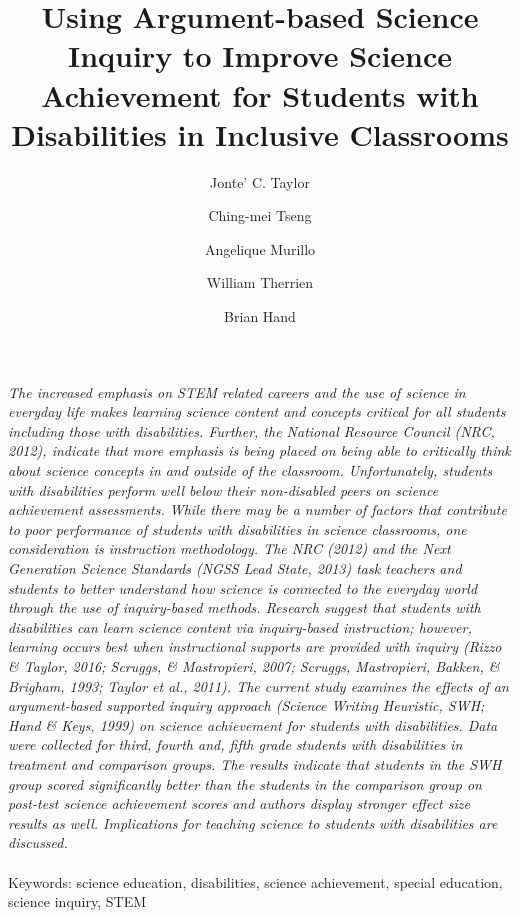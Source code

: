 \documentclass[11.5pt]{sig-alternate} %
\makeatletter
\let\oldabstract\abstract
\let\oldendabstract\endabstract
\renewenvironment{abstract} %
{\renewenvironment{quotation}%
               {\list{}{\addtolength{\leftmargin}{1em} %
                        \listparindent 1.5em%
                        \itemindent    \listparindent%
                        \rightmargin   \leftmargin%
                        \parsep        \z@ \@plus\p@}%
                \item\relax}%
               {\endlist}%
\oldabstract}
{\oldendabstract}
\makeatother
\begin{document}
\title{Using Argument-based Science Inquiry to Improve Science Achievement for Students with Disabilities in Inclusive Classrooms}

\author[1]{\large \color{blue}Jonte’ C. Taylor}
\author[2]{\large \color{blue}Ching-mei Tseng}
\author[1]{\large \color{blue}Angelique Murillo}
\author[3]{\large \color{blue}William Therrien}
\author[4]{\large \color{blue}Brian Hand}


\toappear{}
\maketitle
\begin{@twocolumnfalse} 
\begin{abstract}
\item 
\textit{The increased emphasis on STEM related careers and the use of science in everyday life makes learning science content and concepts critical for all students including those with disabilities. Further, the National Resource Council (NRC, 2012), indicate that more emphasis is being placed on being able to critically think about science concepts in and outside of the classroom.  Unfortunately, students with disabilities perform well below their non-disabled peers on science achievement assessments.  While there may be a number of factors that contribute to poor performance of students with disabilities in science classrooms, one consideration is instruction methodology.  The NRC (2012) and the Next Generation Science Standards (NGSS Lead State, 2013) task teachers and students to better understand how science is connected to the everyday world through the use of inquiry-based methods.  Research suggest that students with disabilities can learn science content via inquiry-based instruction; however, learning occurs best when instructional supports are provided with inquiry (Rizzo \& Taylor, 2016; Scruggs, \& Mastropieri, 2007; Scruggs, Mastropieri, Bakken, \& Brigham, 1993; Taylor et al., 2011).  The current study examines the effects of an argument-based supported inquiry approach (Science Writing Heuristic, SWH; Hand \& Keys, 1999) on science achievement for students with disabilities.  Data were collected for third, fourth and, fifth grade students with disabilities in treatment and comparison groups.  The results indicate that students in the SWH group scored significantly better than the students in the comparison group on post-test science achievement scores and authors display stronger effect size results as well.  Implications for teaching science to students with disabilities are discussed. 
}
\\ \\
Keywords: science education, disabilities, science achievement, special education, science inquiry, STEM
\end{abstract}
\end{@twocolumnfalse}
\end{document}
